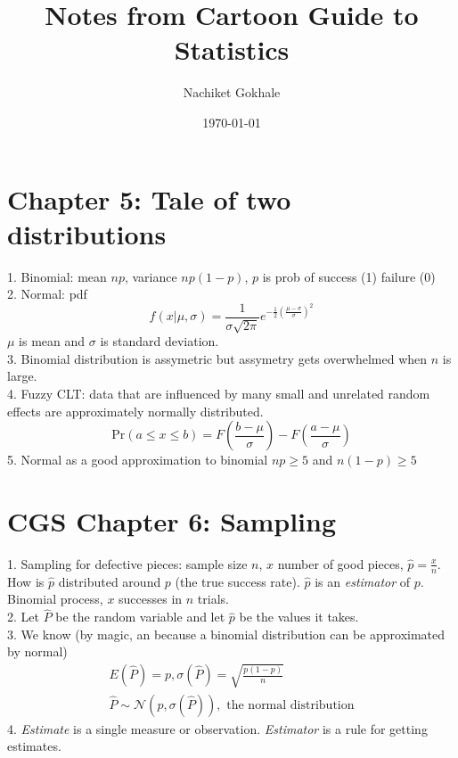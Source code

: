 \documentclass{article}
\newcommand{\beq}{\begin{equation}}
\newcommand{\eeq}{\end{equation}}
\newcommand{\ber}{\begin{eqnarray}}
\newcommand{\eer}{\end{eqnarray}}
\begin{document}
\title{Notes from Cartoon Guide to Statistics}
\author{Nachiket Gokhale}
\date{\today}
\maketitle
\section{Chapter 5: Tale of two distributions}
1. Binomial: mean $np$, variance $np(1-p)$, $p$ is prob of success (1) failure (0)\\
2. Normal: pdf
\beq
f(x|\mu,\sigma) = \frac{1}{\sigma\sqrt{2\pi}}e^{-\frac{1}{2}(\frac{\mu-\sigma}{\sigma})^2}
\eeq
$\mu$ is mean and $\sigma$ is standard deviation.\\
3. Binomial distribution is assymetric but assymetry gets overwhelmed when $n$ is large.\\
4. Fuzzy CLT: data that are influenced by many small and unrelated random effects are approximately normally distributed.
\beq
\text{Pr}(a\le{x}\le{b}) = F(\frac{b-\mu}{\sigma}) - F(\frac{a-\mu}{\sigma})
\eeq
5. Normal as a good approximation to binomial $np \ge 5 $ and $n(1-p)\ge 5$
\section{CGS Chapter 6: Sampling}
1. Sampling for defective pieces: sample size $n$, $x$ number of good pieces, $\hat{p}=\frac{x}{n}$. How is $\hat{p}$ distributed around $p$ (the true success rate). $\hat{p}$ is an \textit{estimator} of $p$. Binomial process, $x$ successes in $n$ trials.\\
2. Let $\hat{P}$ be the random variable and let $\hat{p}$ be the values it takes.\\
3. We know (by magic, an because a binomial distribution can be approximated by normal)
\ber
E(\hat{P}) = p , \sigma(\hat{P}) = \sqrt{\frac{p(1-p)}{n}}\\
\hat{P}\sim\mathcal{N}(p,\sigma(\hat{P})), \text{ the normal distribution}
\eer
4. \textit{Estimate} is a single measure or observation. \textit{Estimator} is a rule for getting estimates.\\
\end{document}
